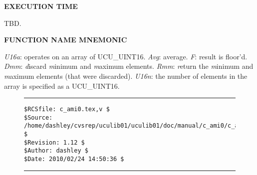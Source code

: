 \noindent\textbf{EXECUTION TIME}
\begin{list}{}{\setlength{\leftmargin}{0.25in}\setlength{\topsep}{0.0in}}
\item TBD.
\end{list}
\vspace{2.8ex}

\noindent\textbf{FUNCTION NAME MNEMONIC}
\begin{list}{}{\setlength{\leftmargin}{0.25in}\setlength{\topsep}{0.0in}}
\item \emph{U16a}:   operates on an array of UCU\_UINT16.
      \emph{Avg}:    average.
      \emph{F}:      result is floor'd.
      \emph{Dmm}:    \emph{d}iscard \emph{m}inimum and \emph{m}aximum elements.
      \emph{Rmm}:    \emph{r}eturn the \emph{m}inimum and \emph{m}aximum elements
                     (that were discarded).
      \emph{U16n}:   the number of elements in the array is specified
                     as a UCU\_UINT16.
\end{list}


\noindent\begin{figure}[!b]
\noindent\rule[-0.25in]{\textwidth}{1pt}
\begin{tiny}
\begin{verbatim}
$RCSfile: c_ami0.tex,v $
$Source: /home/dashley/cvsrep/uculib01/uculib01/doc/manual/c_ami0/c_ami0.tex,v $
$Revision: 1.12 $
$Author: dashley $
$Date: 2010/02/24 14:50:36 $
\end{verbatim}
\end{tiny}
\noindent\rule[0.25in]{\textwidth}{1pt}
\end{figure}

%
%
%
%
%
%
%
%
%
%
%

